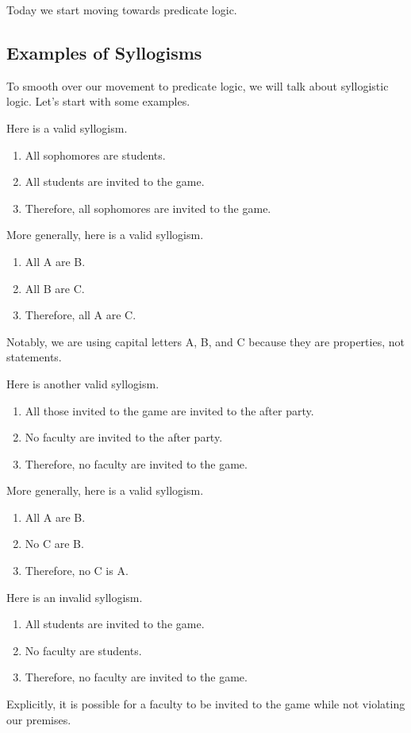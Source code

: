 
Today we start moving towards predicate logic.

\subsection{Examples of Syllogisms}
To smooth over our movement to predicate logic, we will talk about syllogistic logic. Let's start with some examples.
\begin{example}
	Here is a valid syllogism.
	\begin{enumerate}
		\item All sophomores are students.
		\item All students are invited to the game.
		\item Therefore, all sophomores are invited to the game.
	\end{enumerate}
\end{example}
\begin{example}
	More generally, here is a valid syllogism.
	\begin{enumerate}
		\item All A are B.
		\item All B are C.
		\item Therefore, all A are C.
	\end{enumerate}
\end{example}
\begin{remark}
	Notably, we are using capital letters A, B, and C because they are properties, not statements.
\end{remark}
\begin{example}
	Here is another valid syllogism.
	\begin{enumerate}
		\item All those invited to the game are invited to the after party.
		\item No faculty are invited to the after party.
		\item Therefore, no faculty are invited to the game.
	\end{enumerate}
\end{example}
\begin{example}
	More generally, here is a valid syllogism.
	\begin{enumerate}
		\item All A are B.
		\item No C are B.
		\item Therefore, no C is A.
	\end{enumerate}
\end{example}
\begin{nex}
	Here is an invalid syllogism.
	\begin{enumerate}
		\item All students are invited to the game.
		\item No faculty are students.
		\item Therefore, no faculty are invited to the game.
	\end{enumerate}
	Explicitly, it is possible for a faculty to be invited to the game while not violating our premises.
\end{nex}

